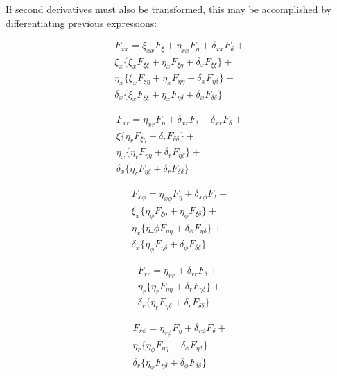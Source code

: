 If second derivatives must also be transformed, this may be accomplished by
differentiating previous expressions:

\begin{multline}
  F_{xx} = \xi_{xx} F_\xi + \eta_{xx} F_\eta + \delta_{xx} F_\delta + \\
  \xi_x \{ \xi_x F_{\xi\xi} + \eta_x F_{\xi\eta}  + \delta_x F_{\xi\xi} \} + \\
  \eta_x \{ \xi_x F_{\xi\eta} + \eta_x F_{\eta\eta} + \delta_x F_{\eta\delta} \} + \\
  \delta_x\{ \xi_x F_{\xi\xi} + \eta_x F_{\eta\delta} + \delta_x F_{\delta\delta} \} 
\end{multline}

\begin{multline}
  F_{xr}  = \eta_{xr} F_\eta + \delta_{xr} F_\delta + \delta_{xr}F_\delta + \\
  \xi \{ \eta_r F_{\xi\eta} + \delta_r F_{\delta\delta} \} + \\
  \eta_x \{ \eta_r F_{\eta\eta} + \delta_r F_{\eta\delta} \} + \\
  \delta_x \{ \eta_r F_{\eta\delta} + \delta_r F_{\delta\delta} \} 
\end{multline}

\begin{multline}
  F_{x\phi} = \eta_{x\phi} F_\eta + \delta_{x\phi} F_\delta + \\
  \xi_x \{ \eta_\phi F_{\xi\eta} + \eta_\phi F_{\xi\delta} \} + \\
  \eta_x \{ \eta\_\phi F_{\eta\eta} + \delta_\phi F_{\eta\delta} \} + \\
  \delta_x \{ \eta_\phi F_{\eta\delta} + \delta_\phi F_{\delta\delta} \}
\end{multline}

\begin{multline}
  F_{rr} = \eta_{rr} + \delta_{rr} F_\delta + \\
  \eta_r \{ \eta_r F_{\eta\eta} + \delta_r F_{\eta\delta} \} + \\
  \delta_r \{ \eta_r F_{\eta\delta} + \delta_r F_{\delta\delta} \} 
\end{multline}

\begin{multline}
  F_{r\phi} = \eta_{r\phi} F_\eta + \delta_{r\phi} F_\delta + \\
  \eta_r \{ \eta_\phi F_{\eta\eta} + \delta_\phi F_{\eta\delta} \} + \\
  \delta_r \{ \eta_\phi F_{\eta\delta} + \delta_\phi F_{\delta\delta} \}
\end{multline}

